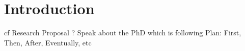 \documentclass[twoside,10pt,openany,a4paper]{rapport}
\begin{document}
\mainmatter


\chapter{Introduction}
cf Research Proposal ?
Speak about the PhD which is following
Plan: First, Then, After, Eventually, etc











% 

















\end{document}
